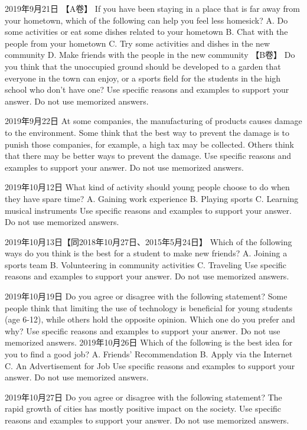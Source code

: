 2019年9月21日
【A卷】
If you have been staying in a place that is far away from your hometown, which of the following can help you feel less homesick?
A. Do some activities or eat some dishes related to your hometown
B. Chat with the people from your hometown
C. Try some activities and dishes in the new community
D. Make friends with the people in the new community
【B卷】
Do you think that the unoccupied ground should be developed to a garden that everyone in the town can enjoy, or a sports field for the students in the high school who don’t have one?
Use specific reasons and examples to support your answer. Do not use memorized answers.

2019年9月22日
At some companies, the manufacturing of products causes damage to the environment. Some think that the best way to prevent the damage is to punish those companies, for example, a high tax may be collected. Others think that there may be better ways to prevent the damage.
Use specific reasons and examples to support your answer. Do not use memorized answers.

2019年10月12日
What kind of activity should young people choose to do when they have spare time?
A. Gaining work experience
B. Playing sports
C. Learning musical instruments
Use specific reasons and examples to support your answer. Do not use memorized answers.

2019年10月13日【同2018年10月27日、2015年5月24日】
Which of the following ways do you think is the best for a student to make new friends?
A. Joining a sports team
B. Volunteering in community activities
C. Traveling
Use specific reasons and examples to support your answer. Do not use memorized answers.

2019年10月19日
Do you agree or disagree with the following statement?
Some people think that limiting the use of technology is beneficial for young students (age 6-12), while others hold the opposite opinion. Which one do you prefer and why?
Use specific reasons and examples to support your answer. Do not use memorized answers.
2019年10月26日
Which of the following is the best idea for you to find a good job?
A. Friends' Recommendation
B. Apply via the Internet
C. An Advertisement for Job
Use specific reasons and examples to support your answer. Do not use memorized answers.

2019年10月27日
Do you agree or disagree with the following statement?
The rapid growth of cities has mostly positive impact on the society.
Use specific reasons and examples to support your answer. Do not use memorized answers.

